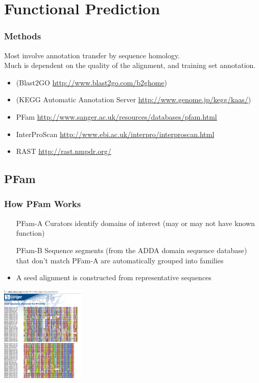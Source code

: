 %

  \section{Functional Prediction}
    \begin{frame}
      \frametitle{Methods}   
      Most involve annotation transfer by sequence homology. \\
      Much is dependent on the quality of the alignment, and training set annotation.
      \begin{itemize}
        \item (Blast2GO \url{http://www.blast2go.com/b2ghome})
        \item (KEGG Automatic Annotation Server \url{http://www.genome.jp/kegg/kaas/})
        \item PFam \url{http://www.sanger.ac.uk/resources/databases/pfam.html}
        \item InterProScan \url{http://www.ebi.ac.uk/interpro/interproscan.html}
        \item RAST \url{http://rast.nmpdr.org/}
      \end{itemize}
    \end{frame}

    \subsection{PFam}
    \begin{frame}
      \frametitle{How PFam Works}   
      \begin{itemize}
        \item [PFam-A] Curators identify domains of interest (may or may not have known function)
        \item [PFam-B] Sequence segments (from the ADDA domain sequence database) that don't match PFam-A are automatically grouped into families
        \item A seed alignment is constructed from representative sequences
      \end{itemize}
      \begin{center}
        \includegraphics[width=0.3\textwidth]{images/pfam1}     
      \end{center}      
    \end{frame}

